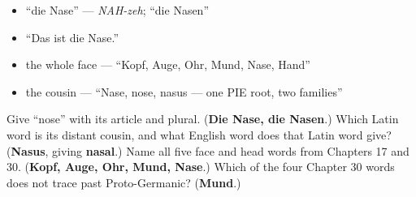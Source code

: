 \begin{itemize}
\raggedright
  \item \textquotedblleft{}die Nase\textquotedblright{} — \emph{NAH-zeh}; \textquotedblleft{}die Nasen\textquotedblright{}
  \item \textquotedblleft{}Das ist die Nase.\textquotedblright{}
  \item the whole face — \textquotedblleft{}Kopf, Auge, Ohr, Mund, Nase, Hand\textquotedblright{}
  \item the cousin — \textquotedblleft{}Nase, nose, nasus — one PIE root, two families\textquotedblright{}
\end{itemize}

\begin{tcolorbox}[breakable,colback=teal!4,colframe=teal!35!black,title={Before you move on}]
Give \textquotedblleft{}nose\textquotedblright{} with its article and plural. (\textbf{Die Nase, die Nasen}.) Which Latin word is its distant cousin, and what English word does that Latin word give? (\textbf{Nasus}, giving \textbf{nasal}.) Name all five face and head words from Chapters 17 and 30. (\textbf{Kopf, Auge, Ohr, Mund, Nase}.) Which of the four Chapter 30 words does not trace past Proto-Germanic? (\textbf{Mund}.)
\end{tcolorbox}
